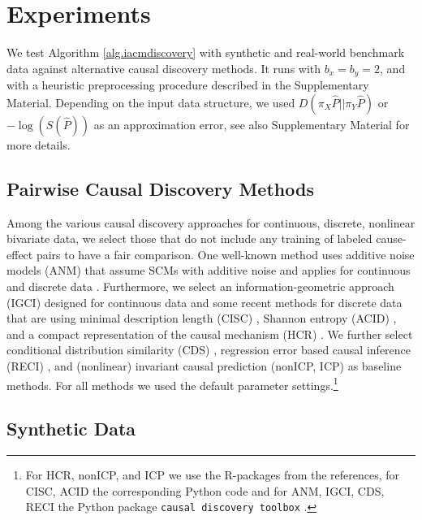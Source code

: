 \documentclass[letterpaper]{article}
\newcommand{\code}[1]{\texttt{#1}}
\begin{document}
\section{Experiments} \label{sec.experiments}

We test Algorithm \ref{alg.iacmdiscovery} with synthetic and real-world benchmark data against alternative causal discovery methods. It runs with $b_x=b_y=2$, and with a heuristic preprocessing procedure described in the Supplementary Material. Depending on the input data structure, we used $D(\pi_X \hat P||\pi_Y \hat P)$ or $-\log(S(\hat P))$ as an approximation error, see also Supplementary Material for more details.

\subsection{Pairwise Causal Discovery Methods}

Among the various causal discovery approaches for continuous, discrete, nonlinear bivariate data, we select those that do not include any training of labeled cause-effect pairs to have a fair comparison. One well-known method uses additive noise models (ANM) that assume SCMs with additive noise and applies for continuous and discrete data \cite{HJMPS09, PJS11}. Furthermore, we select an information-geometric approach (IGCI) \cite{JMZLZDSS12} designed for continuous data and some recent methods for discrete data that are using minimal description length (CISC) \cite{BV17}, Shannon entropy (ACID) \cite{BV18}, and a compact representation of the causal mechanism (HCR) \cite{CQZZH18}. We further select conditional distribution similarity (CDS) \cite{F16}, regression error based causal inference (RECI) \cite{BJWSS18}, and (nonlinear) invariant causal prediction (nonICP, ICP) \cite{HPM18, PBM16} as baseline methods. For all methods we used the default parameter settings.\footnote{For HCR, nonICP, and ICP we use the R-packages from the references, for CISC, ACID the corresponding Python code and for ANM, IGCI, CDS, RECI the Python package \code{causal discovery toolbox} \cite{KG19}.}

\subsection{Synthetic Data}
\end{document}
